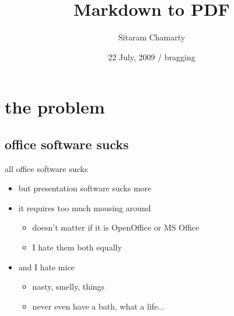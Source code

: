 \documentclass{beamer}
\title[Markdown to PDF] %
    {Markdown to PDF}
\subtitle
    {}
\author[Sitaram] %
    {Sitaram Chamarty}
\institute[TCS] %
    {
      TCS Innovation Labs\\
      Hyderabad}
\date[bragging] %
    {22 July, 2009 / bragging}
\begin{document}
    \begin{frame}
      \titlepage
    \end{frame}




\section{the problem}

\subsection{office software sucks}

\begin{frame}{all office software sucks}

\begin{itemize}
\item
but presentation software sucks more
\item
it requires too much mousing around
\begin{itemize}
\item
doesn't matter if it is OpenOffice or MS Office
\item
I hate them both equally
\end{itemize}
\item
and I hate mice
\begin{itemize}
\pause
\item
nasty, smelly, things
\pause
\item
never even have a bath, what a life...
\end{itemize}
\end{itemize}



\end{frame}
\end{document}
